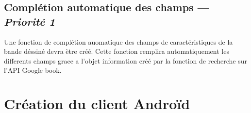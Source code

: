 \subsection[Complétion automatique des champs]{Complétion automatique des champs — \emph{Priorité 1}}
Une fonction de complétion auomatique des champs de caractéristiques de la bande déssiné devra ètre créé. Cette fonction remplira automatiquement les differents champs grace a l'objet information créé par la fonction de recherche sur l'API Google book.
 



\section{Création du client Androïd}





